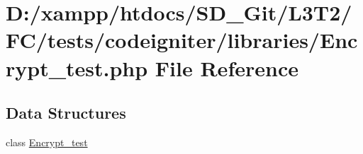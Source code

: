 \hypertarget{_encrypt__test_8php}{}\section{D\+:/xampp/htdocs/\+S\+D\+\_\+\+Git/\+L3\+T2/\+F\+C/tests/codeigniter/libraries/\+Encrypt\+\_\+test.php File Reference}
\label{_encrypt__test_8php}
\subsection*{Data Structures}
\begin{DoxyCompactItemize}
\item 
class \hyperlink{class_encrypt__test}{Encrypt\+\_\+test}
\end{DoxyCompactItemize}
